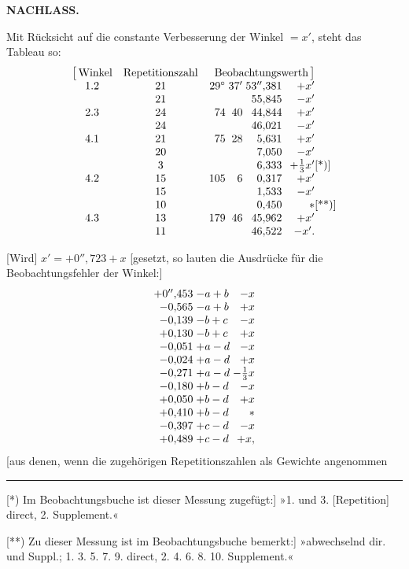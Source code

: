 \par\clearpage
\noindent{}\hfill{\small\textbf{NACHLASS.}}\hfill\null\par\medskip

Mit Rücksicht auf die constante Verbesserung der Winkel \(=x'\), steht das Tableau so:
\[
\begin{array}{@{}c@{\quad}c@{\quad}r@{\;}r@{\;}r@{}r@{}l@{}}
 \bigl[\,\text{Winkel}&\text{Repetitionszahl}&
 \multicolumn{4}{c@{}}{\text{Beobachtungswerth}\,\bigr]}&\\
 1.2&21&29^\circ&37'&53''{,}381&+x'&\\
 &21&&&55{,}845&-x'&\\
 2.3&24&74&40&44{,}844&+x'&\\
 &24&&&46{,}021&-x'&\\
 4.1&21&75&28&5{,}631&+x'&\\
 &20&&&7{,}050&-x'&\\
 &3&&&6{,}333&+\frac13x'&\text{[*)]}\\
 4.2&15&105&6&0{,}317&+x'&\\
 &15&&&1{,}533&-x'&\\
 &10&&&0{,}450&\ast&\text{[**)]}\\
 4.3&13&179&46&45{,}962&+x'&\\
 &11&&&46{,}522&-x'.&
\end{array}
\]

[Wird] \(x'=+0''{,}723+x\) [gesetzt, so lauten die Ausdrücke für die Beobachtungsfehler der Winkel:]
\[
\begin{array}{@{}r@{\;}l@{\;}r@{}}
 +0''{,}453&-a+b&-x\\
 -0{,}565&-a+b&+x\\
 -0{,}139&-b+c&-x\\
 +0{,}130&-b+c&+x\\
 -0{,}051&+a-d&-x\\
 -0{,}024&+a-d&+x\\
 -0{,}271&+a-d&-\frac13x\\
 -0{,}180&+b-d&-x\\
 +0{,}050&+b-d&+x\\
 +0{,}410&+b-d&\ast\\
 -0{,}397&+c-d&-x\\
 +0{,}489&+c-d&+x,
\end{array}
\]
\noindent [aus denen, wenn die zugehörigen Repetitionszahlen als Gewichte angenommen

\par\noindent\rule{4cm}{.4pt}\par
{\footnotesize
\noindent\hspace*{\parindent}[*) Im Beobachtungsbuche ist dieser Messung zugefügt:] »1. und 3. [Repetition] direct, 2. Supplement.«\par
\noindent\hspace*{\parindent}[**) Zu dieser Messung ist im Beobachtungsbuche bemerkt:] »abwechselnd dir. und Suppl.; 1. 3. 5. 7. 9. direct, 2. 4. 6. 8. 10. Supplement.«\par}

